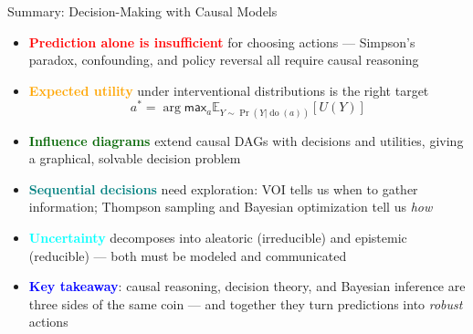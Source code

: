 \documentclass[
  10pt,
  ignorenonframetext,
]{beamer}
\newcommand{\EE}{\mathbb{E}}
\def\max{\textsf{max}}
\begin{document}
\begin{frame}{Summary: Decision-Making with Causal Models}
\label{summary-decision-making-with-causal-models}
\begin{itemize}
\item
  \textbf{\textcolor{red}{Prediction alone is insufficient}} for
  choosing actions --- Simpson's paradox, confounding, and policy
  reversal all require causal reasoning
\item
  \textbf{\textcolor{orange}{Expected utility}} under interventional
  distributions is the right target \[
  a^* = \arg\max_a \EE_{Y \sim \Pr(Y | \operatorname{do}(a))}[U(Y)]
  \]
\item
  \textbf{\textcolor{darkgreen}{Influence diagrams}} extend causal DAGs
  with decisions and utilities, giving a graphical, solvable decision
  problem
\item
  \textbf{\textcolor{teal}{Sequential decisions}} need exploration: VOI
  tells us when to gather information; Thompson sampling and Bayesian
  optimization tell us \emph{how}
\item
  \textbf{\textcolor{cyan}{Uncertainty}} decomposes into aleatoric
  (irreducible) and epistemic (reducible) --- both must be modeled and
  communicated
\item
  \textbf{\textcolor{blue}{Key takeaway}}: causal reasoning, decision
  theory, and Bayesian inference are three sides of the same coin ---
  and together they turn predictions into \emph{robust} actions
\end{itemize}
\end{frame}
\end{document}
